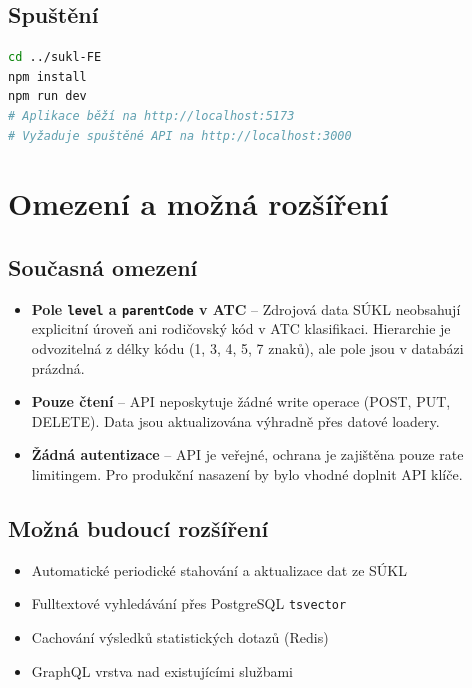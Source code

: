 \documentclass[12pt,a4paper]{article}
\begin{document}
\subsection{Spuštění}

\begin{lstlisting}[language=bash]
cd ../sukl-FE
npm install
npm run dev
# Aplikace běží na http://localhost:5173
# Vyžaduje spuštěné API na http://localhost:3000
\end{lstlisting}

\section{Omezení a možná rozšíření}

\subsection{Současná omezení}

\begin{itemize}
  \item \textbf{Pole \texttt{level} a \texttt{parentCode} v ATC} -- Zdrojová data SÚKL neobsahují explicitní úroveň ani rodičovský kód v ATC klasifikaci. Hierarchie je odvozitelná z délky kódu (1, 3, 4, 5, 7 znaků), ale pole jsou v databázi prázdná.
  \item \textbf{Pouze čtení} -- API neposkytuje žádné write operace (POST, PUT, DELETE). Data jsou aktualizována výhradně přes datové loadery.
  \item \textbf{Žádná autentizace} -- API je veřejné, ochrana je zajištěna pouze rate limitingem. Pro produkční nasazení by bylo vhodné doplnit API klíče.
\end{itemize}

\subsection{Možná budoucí rozšíření}

\begin{itemize}
  \item Automatické periodické stahování a aktualizace dat ze SÚKL
  \item Fulltextové vyhledávání přes PostgreSQL \texttt{tsvector}
  \item Cachování výsledků statistických dotazů (Redis)
  \item GraphQL vrstva nad existujícími službami
\end{itemize}
\end{document}
